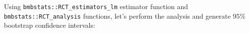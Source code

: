 \documentclass[
]{book}
\newenvironment{Shaded}{\begin{snugshade}}{\end{snugshade}}
\newcommand{\CommentTok}[1]{\textcolor[rgb]{0.56,0.35,0.01}{\textit{#1}}}
\newcommand{\DataTypeTok}[1]{\textcolor[rgb]{0.13,0.29,0.53}{#1}}
\newcommand{\DecValTok}[1]{\textcolor[rgb]{0.00,0.00,0.81}{#1}}
\newcommand{\KeywordTok}[1]{\textcolor[rgb]{0.13,0.29,0.53}{\textbf{#1}}}
\newcommand{\NormalTok}[1]{#1}
\newcommand{\OperatorTok}[1]{\textcolor[rgb]{0.81,0.36,0.00}{\textbf{#1}}}
\newcommand{\StringTok}[1]{\textcolor[rgb]{0.31,0.60,0.02}{#1}}
\begin{document}
\begin{Shaded}
\end{Shaded}

Using \texttt{bmbstats::RCT\_estimators\_lm} estimator function and \texttt{bmbstats::RCT\_analysis} functions, let's perform the analysis and generate 95\% bootstrap confidence intervals:
\end{document}
